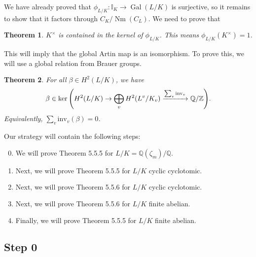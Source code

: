 \documentclass[leqno, openany]{memoir}
\newtheorem{thm}{Theorem}[section]
\theoremstyle{definition}
\theoremstyle{remark}
\theoremstyle{plain}
\theoremstyle{definition}
\theoremstyle{remark}
\newcommand{\Z}{\mathbb{Z}}
\newcommand{\Q}{\mathbb{Q}}
\newcommand{\I}{\mathbb{I}}
\newcommand{\mr}[1]{\mathrm{#1}}
\DeclareMathOperator{\Gal}{Gal}
\DeclareMathOperator{\Nm}{Nm}
\begin{document}
We have already proved that $\phi_{L/K} \colon \I_K \to \Gal(L/K)$ is surjective, so it remains to show that it factors through $C_K/\Nm(C_L)$. We need to prove that
\begin{thm}
    $K^{\times}$ is contained in the kernel of $\phi_{L/K}$. This means $\phi_{L/K}(K^{\times}) = 1$.
\end{thm}
This will imply that the global Artin map is an isomorphism. To prove this, we will use a global relation from Brauer groups.

\begin{thm}
    For all $\beta \in H^2(L/K)$, we have 
    \[ \beta \in \ker \qty(H^2(L/K) \to \bigoplus_v H^2(L^v/K_v) \xrightarrow{\sum_v \mr{inv}_v} \Q/\Z). \]
    Equivalently, $\sum_v \mr{inv}_v(\beta) = 0$.
\end{thm}

Our strategy will contain the following steps:
\begin{enumerate}
    \setcounter{enumi}{-1}
    \item We will prove Theorem 5.5.5 for $L/K = \Q(\zeta_m)/\Q$.
    \item Next, we will prove Theorem 5.5.5 for $L/K$ cyclic cyclotomic.
    \item Next, we will prove Theorem 5.5.6 for $L/K$ cyclic cyclotomic.
    \item Next, we will prove Theorem 5.5.6 for $L/K$ finite abelian.
    \item Finally, we will prove Theorem 5.5.5 for $L/K$ finite abelian.
\end{enumerate}

\subsection{Step 0}%
\label{sub:step_0}
\end{document}
